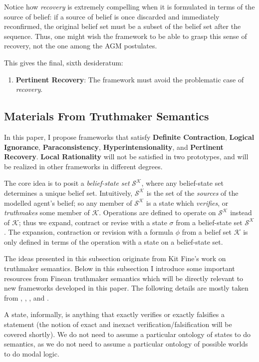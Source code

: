 \documentclass[12pt]{article}
\newcommand{\K}{\mathcal{K}}
\newcommand{\SK}{\mathcal{S}^\mathcal{K}}
\begin{document}
\par
Notice how \textit{recovery} is extremely compelling when it is formulated in terms of the source of belief: if a source of belief is once discarded and immediately reconfirmed, the original belief set must be a subset of the belief set after the sequence. Thus, one might wish the framework to be able to grasp this sense of recovery, not the one among the AGM postulates. 
\par
This gives the final, sixth desideratum:
\begin{enumerate}
    \item[(D6)] \textbf{Pertinent Recovery}: The framework must avoid the problematic case of \textit{recovery}. 
\end{enumerate}
\subsection{Materials From Truthmaker Semantics}
In this paper, I propose frameworks that satisfy \textbf{Definite Contraction}, \textbf{Logical Ignorance}, \textbf{Paraconsistency}, \textbf{Hyperintensionality}, and \textbf{Pertinent Recovery}. \textbf{Local Rationality} will not be satisfied in two prototypes, and will be realized in other frameworks in different degrees. 
\par 
The core idea is to posit a \textit{belief-state set} $\SK$, where any belief-state set determines a unique belief set. Intuitively, $\SK$ is the set of the \textit{sources} of the modelled agent's belief; so any member of $\SK$ is a state which \textit{verifies}, or \textit{truthmakes} some member of $\K$. Operations are defined to operate on $\SK$ instead of $\K$; thus we expand, contract or revise with a state $\sigma$ from a belief-state set $\SK$. The expansion, contraction or revision with a formula $\phi$ from a belief set $\K$ is only defined in terms of the operation with a state on a belief-state set. 
\par 
The ideas presented in this subsection originate from Kit Fine's work on truthmaker semantics. Below in this subsection I introduce some important resources from Finean truthmaker semantics which will be directly relevant to new frameworks developed in this paper. The following details are mostly taken from , , , and .
\par
A state, informally, is anything that exactly verifies or exactly falsifies a statement (the notion of exact and inexact verification/falsification will be covered shortly). We do not need to assume a particular ontology of states to do semantics, as we do not need to assume a particular ontology of possible worlds to do modal logic. 
\end{document}
